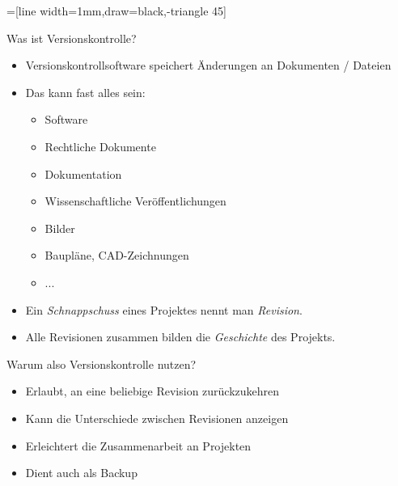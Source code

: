 \newcommand{\mail}{\texttt{[image: figures/mail.pdf]}}
=[line width=1mm,draw=black,-triangle 45]

\begin{frame}[c]{Was ist Versionskontrolle?}
  \begin{itemize}
    \item Versionskontrollsoftware speichert Änderungen an Dokumenten / Dateien
    \item Das kann fast alles sein:
      \begin{itemize}
        \item Software
        \item Rechtliche Dokumente
        \item Dokumentation
        \item Wissenschaftliche Veröffentlichungen
        \item Bilder
        \item Baupläne, CAD-Zeichnungen
        \item ...
      \end{itemize}
    \item Ein \emph{Schnappschuss} eines Projektes nennt man \emph{Revision}.
    \item Alle Revisionen zusammen bilden die \emph{Geschichte} des Projekts.
  \end{itemize}
\end{frame}

\begin{frame}[c]{Warum also Versionskontrolle nutzen?}
  \begin{itemize}
    \item Erlaubt, an eine beliebige Revision zurückzukehren
    \item Kann die Unterschiede zwischen Revisionen anzeigen
    \item Erleichtert die Zusammenarbeit an Projekten
    \item Dient auch als Backup
  \end{itemize}
\end{frame}

